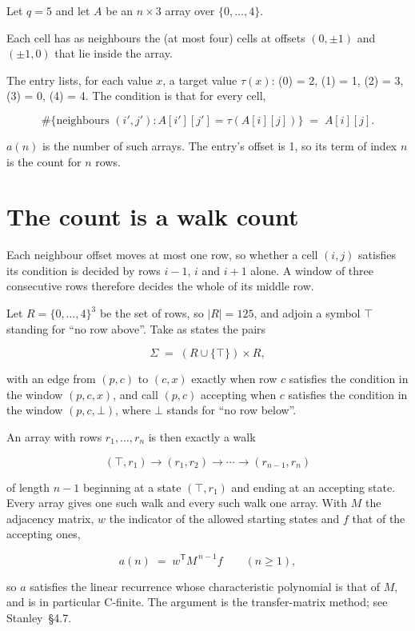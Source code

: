 \documentclass[11pt]{article}
\theoremstyle{definition}
\begin{document}
Let $q = 5$ and let $A$ be an $n \times 3$ array over $\{0,\dots,4\}$.

Each cell has as neighbours the (at most four) cells at offsets $(0,\pm1)$ and $(\pm1,0)$ that lie inside the array.

The entry lists, for each value $x$, a target value $\tau(x)$: \tau(0) = 2, \tau(1) = 1, \tau(2) = 3, \tau(3) = 0, \tau(4) = 4. The condition is that for every cell,

\[\#\{\text{neighbours } (i',j') : A[i'][j'] = \tau(A[i][j])\} \;=\; A[i][j].\]

$a(n)$ is the number of such arrays. The entry's offset is 1, so its term of index $n$ is the count for $n$ rows.

\section{The count is a walk count}

Each neighbour offset moves at most one row, so whether a cell $(i,j)$ satisfies its condition is decided by rows $i-1$, $i$ and $i+1$ alone. A window of three consecutive rows therefore decides the whole of its middle row.

Let $R = \{0,\dots,4\}^{3}$ be the set of rows, so $|R| = 125$, and adjoin a symbol $\top$ standing for ``no row above''. Take as states the pairs

\[\Sigma \;=\; (R \cup \{\top\}) \times R,\]

with an edge from $(p,c)$ to $(c,x)$ exactly when row $c$ satisfies the condition in the window $(p,c,x)$, and call $(p,c)$ accepting when $c$ satisfies the condition in the window $(p,c,\bot)$, where $\bot$ stands for ``no row below''.

An array with rows $r_1,\dots,r_n$ is then exactly a walk

\[(\top,r_1) \to (r_1,r_2) \to \cdots \to (r_{n-1},r_n)\]

of length $n-1$ beginning at a state $(\top,r_1)$ and ending at an accepting state. Every array gives one such walk and every such walk one array. With $M$ the adjacency matrix, $w$ the indicator of the allowed starting states and $f$ that of the accepting ones,

\[a(n) \;=\; w^{\mathsf T} M^{\,n-1} f \qquad (n \ge 1),\]

so $a$ satisfies the linear recurrence whose characteristic polynomial is that of $M$, and is in particular C-finite. The argument is the transfer-matrix method; see Stanley~\S4.7.
\end{document}
